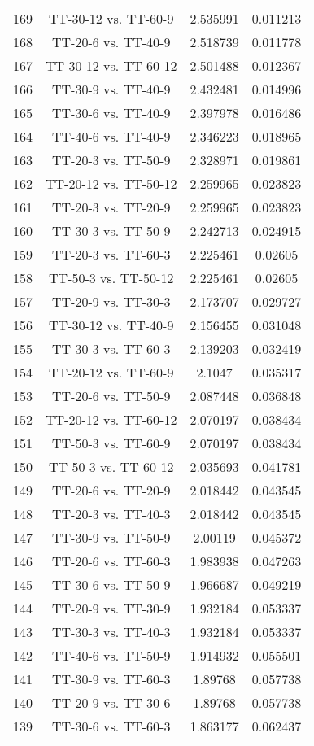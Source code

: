 \documentclass[a4paper,10pt]{article}
\begin{document}
\begin{landscape}
\begin{table}[!htp]
\begin{tabular}{cccc}
169&TT-30-12 vs. TT-60-9&2.535991&0.011213\\
168&TT-20-6 vs. TT-40-9&2.518739&0.011778\\
167&TT-30-12 vs. TT-60-12&2.501488&0.012367\\
166&TT-30-9 vs. TT-40-9&2.432481&0.014996\\
165&TT-30-6 vs. TT-40-9&2.397978&0.016486\\
164&TT-40-6 vs. TT-40-9&2.346223&0.018965\\
163&TT-20-3 vs. TT-50-9&2.328971&0.019861\\
162&TT-20-12 vs. TT-50-12&2.259965&0.023823\\
161&TT-20-3 vs. TT-20-9&2.259965&0.023823\\
160&TT-30-3 vs. TT-50-9&2.242713&0.024915\\
159&TT-20-3 vs. TT-60-3&2.225461&0.02605\\
158&TT-50-3 vs. TT-50-12&2.225461&0.02605\\
157&TT-20-9 vs. TT-30-3&2.173707&0.029727\\
156&TT-30-12 vs. TT-40-9&2.156455&0.031048\\
155&TT-30-3 vs. TT-60-3&2.139203&0.032419\\
154&TT-20-12 vs. TT-60-9&2.1047&0.035317\\
153&TT-20-6 vs. TT-50-9&2.087448&0.036848\\
152&TT-20-12 vs. TT-60-12&2.070197&0.038434\\
151&TT-50-3 vs. TT-60-9&2.070197&0.038434\\
150&TT-50-3 vs. TT-60-12&2.035693&0.041781\\
149&TT-20-6 vs. TT-20-9&2.018442&0.043545\\
148&TT-20-3 vs. TT-40-3&2.018442&0.043545\\
147&TT-30-9 vs. TT-50-9&2.00119&0.045372\\
146&TT-20-6 vs. TT-60-3&1.983938&0.047263\\
145&TT-30-6 vs. TT-50-9&1.966687&0.049219\\
144&TT-20-9 vs. TT-30-9&1.932184&0.053337\\
143&TT-30-3 vs. TT-40-3&1.932184&0.053337\\
142&TT-40-6 vs. TT-50-9&1.914932&0.055501\\
141&TT-30-9 vs. TT-60-3&1.89768&0.057738\\
140&TT-20-9 vs. TT-30-6&1.89768&0.057738\\
139&TT-30-6 vs. TT-60-3&1.863177&0.062437\\

\end{tabular}
\end{table}
\end{landscape}
\end{document}
